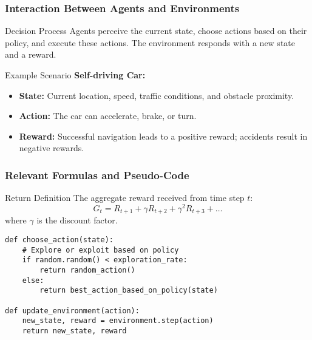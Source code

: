 \documentclass[aspectratio=169]{beamer}
\begin{document}
\begin{frame}
    \frametitle{Interaction Between Agents and Environments}
    \begin{block}{Decision Process}
        Agents perceive the current state, choose actions based on their policy, and execute these actions. The environment responds with a new state and a reward.
    \end{block}

    \begin{block}{Example Scenario}
        \textbf{Self-driving Car:}
        \begin{itemize}
            \item \textbf{State:} Current location, speed, traffic conditions, and obstacle proximity.
            \item \textbf{Action:} The car can accelerate, brake, or turn.
            \item \textbf{Reward:} Successful navigation leads to a positive reward; accidents result in negative rewards.
        \end{itemize}
    \end{block}
\end{frame}

\begin{frame}[fragile]
    \frametitle{Relevant Formulas and Pseudo-Code}
    \begin{block}{Return Definition}
        The aggregate reward received from time step \( t \):
        \begin{equation}
            G_t = R_{t+1} + \gamma R_{t+2} + \gamma^2 R_{t+3} + \ldots
        \end{equation}
        where \( \gamma \) is the discount factor.

    \end{block}

    \begin{lstlisting}
def choose_action(state):
    # Explore or exploit based on policy
    if random.random() < exploration_rate:
        return random_action()
    else:
        return best_action_based_on_policy(state)

def update_environment(action):
    new_state, reward = environment.step(action)
    return new_state, reward
    \end{lstlisting}
\end{frame}
\end{document}
